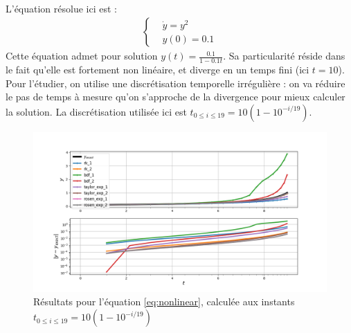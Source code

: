         \paragraph{}
        L'équation résolue ici est :
        \begin{equation}
            \begin{split}
                \left\{
                \begin{aligned}
                    &\dot{y} = y^2 \\
                    &y\left(0\right) = 0.1
                \end{aligned}
                \right.
            \end{split}
        \label{eq:nonlinear}
        \end{equation}
        Cette équation admet pour solution $y\left(t\right) = \frac{0.1}{1 - 0.1t}$. Sa particularité réside dans le fait qu'elle est fortement non linéaire, et diverge en un temps fini (ici $t = 10$). Pour l'étudier, on utilise une discrétisation temporelle irrégulière : on va réduire le pas de temps à mesure qu'on s'approche de la divergence pour mieux calculer la solution. La discrétisation utilisée ici est $t_{0\leq i\leq 19} = 10\left(1 - 10^{-i/19}\right)$.
        \begin{figure}[H]
            \centering
            \includegraphics[trim = 0cm 0cm 0cm 1cm, clip, width=\textwidth]{images/resultats/edo_nonlinear.png}
            \caption{Résultats pour l'équation \ref{eq:nonlinear}, calculée aux instants $t_{0\leq i\leq 19} = 10\left(1 - 10^{-i/19}\right)$}
            \label{fig:edo_non_lineaire}
        \end{figure}

